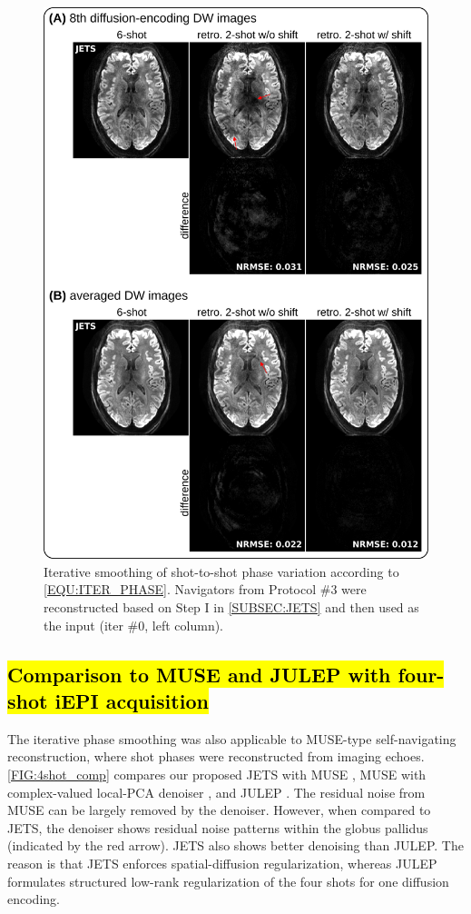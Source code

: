 \documentclass[preprint,12pt,authoryear,review]{elsarticle}
\begin{document}
    \begin{figure}
        \centering
        \includegraphics[width=0.85\linewidth]{../figures/fig2.png}
        \caption{Iterative smoothing of shot-to-shot phase variation
        according to \cref{EQU:ITER_PHASE}.
        Navigators from Protocol \#3 were reconstructed
        based on Step I in \cref{SUBSEC:JETS}
        and then used as the input (iter \#0, left column).}
        \label{FIG:iter_phase}
    \end{figure}


    \subsection{\hl{Comparison to MUSE and JULEP with four-shot iEPI acquisition}}

    The iterative phase smoothing was also applicable to
    MUSE-type self-navigating reconstruction,
    where shot phases were
    reconstructed from imaging echoes.
    \cref{FIG:4shot_comp} compares our proposed JETS with
    MUSE \citep{chen_2013_muse},
    MUSE with complex-valued local-PCA denoiser
    \citep{cordero_2019_cplxdwi},
    and JULEP \citep{dai_2023_julep}.
    The residual noise from MUSE can be largely removed
    by the denoiser. However, when compared to JETS,
    the denoiser shows residual noise patterns within
    the globus pallidus (indicated by the red arrow).
    JETS also shows better denoising than JULEP.
    The reason is that JETS enforces spatial-diffusion regularization,
    whereas JULEP formulates structured low-rank regularization
    of the four shots for one diffusion encoding.
\end{document}
